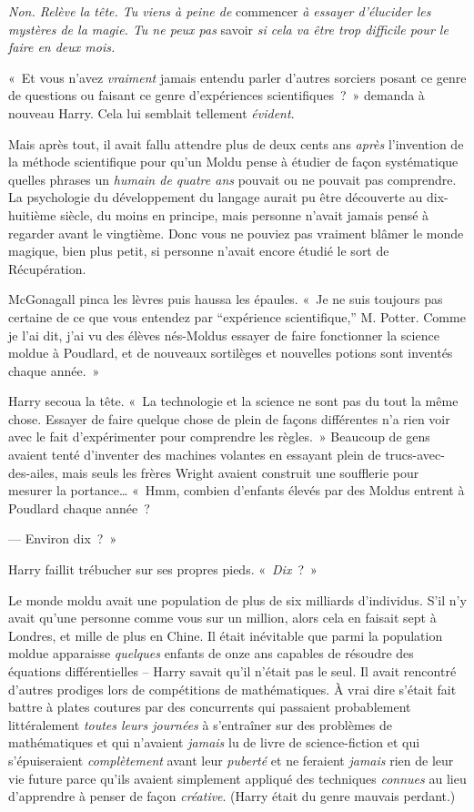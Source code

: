 \emph{Non. Relève la tête. Tu viens à peine de} commencer \emph{à essayer d'élucider les mystères de la magie. Tu ne peux pas} savoir \emph{si cela va être trop difficile pour le faire en deux mois.}

«~Et vous n'avez \emph{vraiment} jamais entendu parler d'autres sorciers posant ce genre de questions ou faisant ce genre d'expériences scientifiques~?~» demanda à nouveau Harry.
Cela lui semblait tellement \emph{évident}.

Mais après tout, il avait fallu attendre plus de deux cents ans \emph{après} l'invention de la méthode scientifique pour qu'un Moldu pense à étudier de façon systématique quelles phrases un \emph{humain de quatre ans} pouvait ou ne pouvait pas comprendre.
La psychologie du développement du langage aurait pu être découverte au dix-huitième siècle, du moins en principe, mais personne n'avait jamais pensé à regarder avant le vingtième. Donc vous ne pouviez pas vraiment blâmer le monde magique, bien plus petit, si personne n'avait encore étudié le sort de Récupération.

McGonagall pinca les lèvres puis haussa les épaules.
«~Je ne suis toujours pas certaine de ce que vous entendez par “expérience scientifique,” M. Potter.
Comme je l'ai dit, j'ai vu des élèves nés-Moldus essayer de faire fonctionner la science moldue à Poudlard, et de nouveaux sortilèges et nouvelles potions sont inventés chaque année.~»

Harry secoua la tête.
«~La technologie et la science ne sont pas du tout la même chose.
Essayer de faire quelque chose de plein de façons différentes n'a rien voir avec le fait d'expérimenter pour comprendre les règles.~»
Beaucoup de gens avaient tenté d'inventer des machines volantes en essayant plein de trucs-avec-des-ailes, mais seuls les frères Wright avaient construit une soufflerie pour mesurer la portance…
«~Hmm, combien d'enfants élevés par des Moldus entrent à Poudlard chaque année~?

--- Environ dix~?~»

Harry faillit trébucher sur ses propres pieds. «~\emph{Dix}~?~»

Le monde moldu avait une population de plus de six milliards d'individus.
S'il n'y avait qu'une personne comme vous sur un million, alors cela en faisait sept à Londres, et mille de plus en Chine.
Il était inévitable que parmi la population moldue apparaisse \emph{quelques} enfants de onze ans capables de résoudre des équations différentielles --
Harry savait qu'il n'était pas le seul.  Il avait rencontré d'autres prodiges lors de compétitions de mathématiques.
À vrai dire s'était fait battre à plates coutures par des concurrents qui passaient probablement littéralement \emph{toutes leurs journées} à s'entraîner sur des problèmes de mathématiques et qui n'avaient \emph{jamais} lu de livre de science-fiction et qui s'épuiseraient \emph{complètement} avant leur \emph{puberté} et ne feraient \emph{jamais} rien de leur vie future parce qu'ils avaient simplement appliqué des techniques \emph{connues} au lieu d'apprendre à penser de façon \emph{créative}. (Harry était du genre mauvais perdant.)

